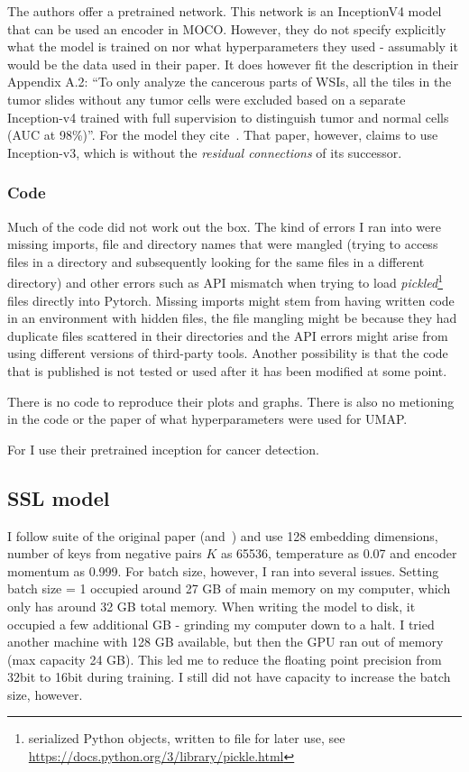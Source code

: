 \documentclass[10pt,twocolumn,letterpaper]{article}
\begin{document}
The authors offer a pretrained network. This network is an InceptionV4 model that can be used an encoder in \gls{MOCO}. However, they do not specify explicitly what the model is trained on nor what hyperparameters they used - assumably it would be the data used in their paper. It does however fit the description in their Appendix A.2: ``To only analyze the cancerous parts of WSIs, all the tiles in the tumor slides without any tumor cells were excluded based on a separate Inception-v4 trained with full supervision to distinguish tumor and normal
cells (AUC at 98\%)''. For the model they cite~\cite{coudray2018classification}. That paper, however, claims to use Inception-v3, which is without the \textit{residual connections} of its successor.

\subsubsection{Code}\label{subsubsec:code}
Much of the code did not work out the box. The kind of errors I ran into were missing imports, file and directory names that were mangled (trying to access files in a directory and subsequently looking for the same files in a different directory) and other errors such as API mismatch when trying to load \textit{pickled}\footnote{serialized Python objects, written to file for later use, see \href{https://docs.python.org/3/library/pickle.html}{https://docs.python.org/3/library/pickle.html}} files directly into Pytorch. Missing imports might stem from having written code in an environment with hidden files, the file mangling might be because they had duplicate files scattered in their directories and the API errors might arise from using different versions of third-party tools. Another possibility is that the code that is published is not tested or used after it has been modified at some point. 

There is no code to reproduce their plots and graphs. There is also no metioning in the code or the paper of what hyperparameters were used for \gls{UMAP}. 

For I use their pretrained inception for cancer detection.

\subsection{SSL model}\label{subsec:mymodel}
I follow suite of the original paper (and~\cite{moco}) and use 128 embedding dimensions, number of keys from negative pairs $K$ as 65536, temperature as 0.07 and encoder momentum as 0.999. For batch size, however, I ran into several issues. Setting batch size = 1 occupied around 27 GB of main memory on my computer, which only has around 32 GB total memory. When writing the model to disk, it occupied a few additional GB - grinding my computer down to a halt. I tried another machine with 128 GB available, but then the \gls{GPU} ran out of memory (max capacity 24 GB). This led me to reduce the floating point precision from 32bit to 16bit during training. I still did not have capacity to increase the batch size, however.
\end{document}
